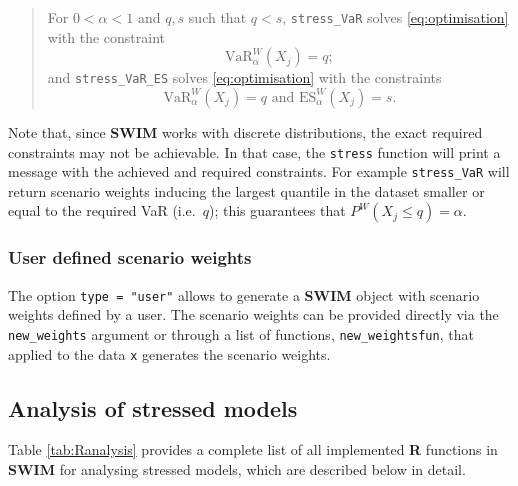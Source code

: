 \documentclass[
]{article}
\begin{document}
\begin{quote}
For \(0< \alpha <1\) and \(q, s\) such that \(q < s\), \texttt{stress\_VaR} solves \eqref{eq:optimisation} with the constraint
\begin{equation} 
\text{VaR}_{\alpha }^W(X_j) = q;  \label{eq:optimisationVaR}
\end{equation}
and \texttt{stress\_VaR\_ES} solves \eqref{eq:optimisation} with the constraints
\begin{equation}                                                
\text{VaR}_{\alpha }^W(X_j) = q \text{ and ES}_{\alpha }^W(X_j) = s.\label{eq:optimisationVaRES}
\end{equation}
\end{quote}

Note that, since \textbf{SWIM} works with discrete distributions, the exact required constraints may not be achievable. In that case, the \texttt{stress} function will print a message with the achieved and required constraints. For example \texttt{stress\_VaR} will return scenario weights inducing the largest quantile in the dataset smaller or equal to the required VaR (i.e.~\(q\)); this guarantees that \(P^W(X_j\leq q)=\alpha\).

\hypertarget{Sec:User}{%
\subsubsection{User defined scenario weights}\label{Sec:User}}

The option \texttt{type\ =\ "user"} allows to generate a \textbf{SWIM} object with scenario weights defined by a user. The scenario weights can be provided directly via the \texttt{new\_weights} argument or through a list of functions, \texttt{new\_weightsfun}, that applied to the data \texttt{x} generates the scenario weights.

\hypertarget{Sec:analysis}{%
\subsection{Analysis of stressed models}\label{Sec:analysis}}

Table \ref{tab:Ranalysis} provides a complete list of all implemented \textbf{R} functions in \textbf{SWIM} for analysing stressed models, which are described below in detail.
\end{document}
